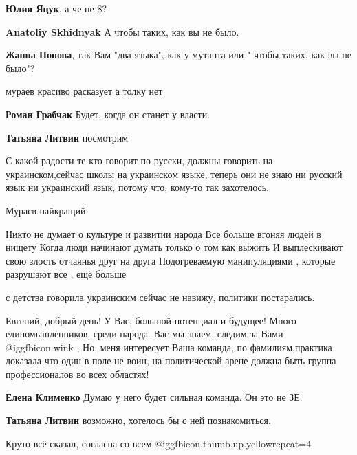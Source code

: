 \begin{itemize}
\begin{itemize} %
\textbf{Юлия Яцук}, а че не 8?

\textbf{Anatoliy Skhidnyak}
А чтобы таких, как вы не было.

\textbf{Жанна Попова}, так Вам "два языка", как у мутанта или " чтобы таких, как вы не было"?
\end{itemize} %

мураев красиво расказует а толку нет

\begin{itemize} %
\textbf{Роман Грабчак} Будет, когда он станет у власти.

\textbf{Татьяна Литвин} посмотрим
\end{itemize} %


С какой радости те кто говорит по русски, должны говорить на украинском,сейчас
школы на украинском языке, теперь они не знаю ни русский язык ни украинский
язык, потому что, кому-то так захотелось.


Мураєв найкращий


Никто не думает о культуре и развитии народа Все больше вгоняя людей в нищету
Когда люди начинают думать только о том как выжить И выплескивают свою злость
отчаянья друг на друга Подогреваемую манипуляциями , которые разрушают все ,
ещё больше

с детства говорила украинским сейчас не навижу, политики постарались.


Евгений, добрый день! У Вас, большой потенциал и будущее! Много
единомышленников, среди народа. Вас мы знаем, следим за Вами @igg{fbicon.wink} , Но, меня
интересует Ваша команда, по фамилиям,практика доказала что один в поле не воин,
на политической арене должна быть группа профессионалов во всех областях!

\begin{itemize} %
\textbf{Елена Клименко} Думаю у него будет сильная команда. Он это не ЗЕ.

\textbf{Татьяна Литвин} возможно, хотелось бы с ней познакомиться.
\end{itemize} %

Круто всё сказал, согласна со всем  @igg{fbicon.thumb.up.yellow}{repeat=4} 


\end{itemize}
